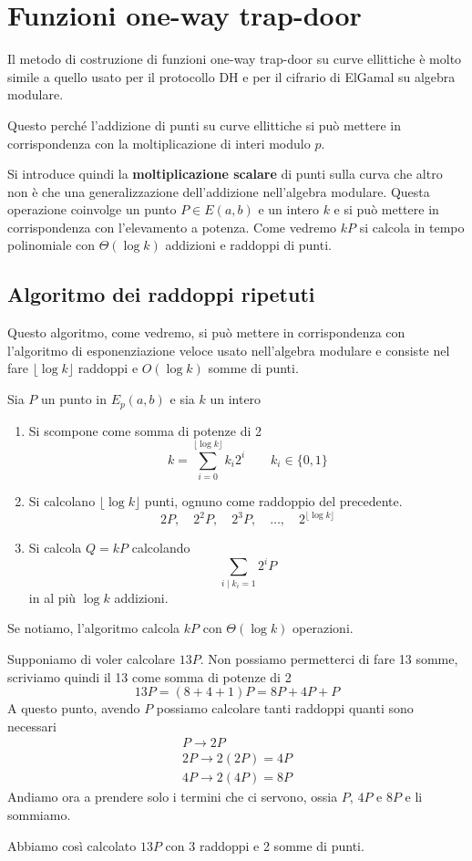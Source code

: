 \section{Funzioni one-way trap-door}
Il metodo di costruzione di funzioni one-way trap-door su curve ellittiche \`e molto simile a quello usato per
il protocollo DH e per il cifrario di ElGamal su algebra modulare.

Questo perch\'e l'addizione di punti su curve ellittiche si pu\`o mettere in corrispondenza con la moltiplicazione
di interi modulo $p$.

Si introduce quindi la \textbf{moltiplicazione scalare} di punti sulla curva che altro non \`e che una
generalizzazione dell'addizione nell'algebra modulare. Questa operazione coinvolge un punto $P \in E(a, b)$ e un
intero $k$ e si pu\`o mettere in corrispondenza con l'elevamento a potenza. Come vedremo $k P$ si calcola
in tempo polinomiale con $\Theta(\log k)$ addizioni e raddoppi di punti.

\subsection{Algoritmo dei raddoppi ripetuti}
Questo algoritmo, come vedremo, si pu\`o mettere in corrispondenza con l'algoritmo di esponenziazione veloce usato
nell'algebra modulare e consiste nel fare $\lfloor \log k \rfloor$ raddoppi e $O(\log k)$ somme di punti.

Sia $P$ un punto in $E_p(a, b)$ e sia $k$ un intero
\begin{enumerate}
	\item Si scompone come somma di potenze di 2
	      \[ k = \sum_{i=0}^{\lfloor \log k \rfloor} k_i 2^i \quad \quad k_i \in \{ 0, 1 \} \]
	\item Si calcolano $\lfloor \log k \rfloor$ punti, ognuno come raddoppio del precedente.
	      \[ 2P, \quad 2^2P, \quad 2^3 P, \quad \dots, \quad 2^{\lfloor\log k \rfloor} \]
	\item Si calcola $Q = kP$ calcolando
	      \[ \sum_{i \mid k_i = 1} 2^i P \]
	      in al pi\`u $\log k$ addizioni.
\end{enumerate}
Se notiamo, l'algoritmo calcola $kP$ con $\Theta(\log k)$ operazioni.

\begin{example}
	Supponiamo di voler calcolare $13P$. Non possiamo permetterci di fare 13 somme, scriviamo quindi il 13 come
	somma di potenze di 2
	\[ 13P = (8 + 4 + 1) P = 8P + 4P + P \]
	A questo punto, avendo $P$ possiamo calcolare tanti raddoppi quanti sono necessari
	\[
		\begin{matrix}
			P \rightarrow 2P          \\
			2P \rightarrow 2(2P) = 4P \\
			4P \rightarrow 2(4P) = 8P
		\end{matrix}
	\]
	Andiamo ora a prendere solo i termini che ci servono, ossia $P$, $4P$ e $8P$ e li sommiamo.

	Abbiamo cos\`i calcolato $13P$ con 3 raddoppi e 2 somme di punti.
\end{example}

